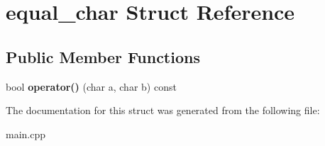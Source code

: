 \hypertarget{structequal__char}{}\section{equal\+\_\+char Struct Reference}
\label{structequal__char}
\subsection*{Public Member Functions}
\begin{DoxyCompactItemize}
\item 
\mbox{\label{structequal__char_a3a986330b95048ea710431b3178c015a}} 
bool {\bfseries operator()} (char a, char b) const
\end{DoxyCompactItemize}


The documentation for this struct was generated from the following file\+:\begin{DoxyCompactItemize}
\item 
main.\+cpp\end{DoxyCompactItemize}
